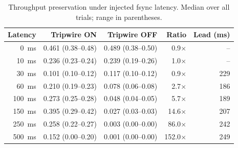 \begin{table}[t]
\centering
\caption{Throughput preservation under injected fsync latency. Median over all trials; range in parentheses.}
\label{tab:tripwire}
\small
\begin{tabular}{r r r r r}
\toprule
\textbf{Latency} & \textbf{Tripwire ON} & \textbf{Tripwire OFF} & \textbf{Ratio} & \textbf{Lead (ms)} \\
\midrule
0~ms & 0.461 (0.38--0.48) & 0.489 (0.38--0.50) & 0.9$\times$ & -- \\
10~ms & 0.236 (0.23--0.24) & 0.239 (0.19--0.26) & 1.0$\times$ & -- \\
30~ms & 0.101 (0.10--0.12) & 0.117 (0.10--0.12) & 0.9$\times$ & 229 \\
60~ms & 0.210 (0.19--0.23) & 0.078 (0.06--0.08) & 2.7$\times$ & 186 \\
100~ms & 0.273 (0.25--0.28) & 0.048 (0.04--0.05) & 5.7$\times$ & 189 \\
150~ms & 0.395 (0.29--0.42) & 0.027 (0.03--0.03) & 14.6$\times$ & 207 \\
250~ms & 0.258 (0.22--0.27) & 0.003 (0.00--0.00) & 86.0$\times$ & 242 \\
500~ms & 0.152 (0.00--0.20) & 0.001 (0.00--0.00) & 152.0$\times$ & 249 \\
\bottomrule
\end{tabular}
\end{table}